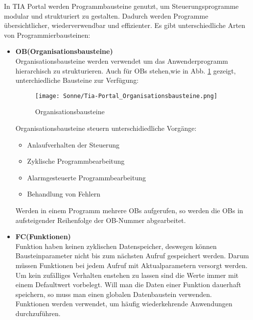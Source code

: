     In TIA Portal werden Programmbausteine genutzt, um Steuerungsprogramme modular und strukturiert zu gestalten. Dadurch werden Programme übersichtlicher, wiederverwendbar und effizienter. Es gibt unterschiedliche Arten von Programmierbausteinen:

    \begin{itemize}
        \item[1.] \textbf{OB(Organisationsbausteine)} \\
            Organisationsbausteine werden verwendet um das Anwenderprogramm hierarchisch zu strukturieren. Auch für OBs stehen,wie in Abb. \ref{Organisationsbausteine} gezeigt, unterchiedliche Bausteine zur Verfügung:
            \begin{figure}[h]
                \texttt{[image: Sonne/Tia-Portal\_Organisationsbausteine.png]}
                \caption{Organisationsbausteine \cite{Programmierleitfaden_für_S7-1500}}
                \label{Organisationsbausteine}
            \end{figure}

            Organisationsbausteine steuern unterschidiedliche Vorgänge:
            \begin{itemize}
                \item Anlaufverhalten der Steuerung
                \item Zyklische Programmbearbeitung
                \item Alarmgesteuerte Programmbearbeitung
                \item Behandlung von Fehlern
            \end{itemize}
            Werden in einem Programm mehrere OBs aufgerufen, so werden die OBs in aufsteigender Reihenfolge der OB-Nummer abgearbeitet. 
            \cite{Programmierleitfaden_für_S7-1500}

        \item[2.] \textbf{FC(Funktionen)} \\
            Funktion haben keinen zyklischen Datenspeicher, deswegen können Bausteinparameter nicht bis zum nächsten Aufruf gespeichert werden. Darum müssen Funktionen bei jedem Aufruf mit Aktualparametern versorgt werden. Um kein zufälliges Verhalten enstehen zu lassen sind die Werte immer mit einem Defaultwert vorbelegt. Will man die Daten einer Funktion dauerhaft speichern, so muss man einen globalen Datenbaustein verwenden.\\
            Funktionen werden verwendet, um häufig wiederkehrende Anwendungen durchzuführen.
            \cite{Programmierleitfaden_für_S7-1500}
            

\end{itemize}
